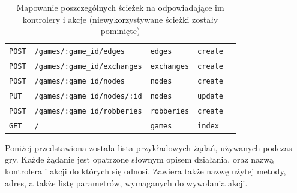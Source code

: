 \documentclass[a4paper,12pt]{article}
\begin{document}
\begin{table}[ht]
\begin{tabular}{|l|l|l|l|l|}
    \texttt{POST} & \texttt{/games/:game\_id/edges} & \texttt{edges} & \texttt{create} \\
    \texttt{POST} & \texttt{/games/:game\_id/exchanges} & \texttt{exchanges} & \texttt{create} \\
    \texttt{POST} & \texttt{/games/:game\_id/nodes} & \texttt{nodes} & \texttt{create} \\
    \texttt{PUT} & \texttt{/games/:game\_id/nodes/:id} & \texttt{nodes} & \texttt{update} \\
    \texttt{POST} & \texttt{/games/:game\_id/robberies} & \texttt{robberies} & \texttt{create} \\
    \texttt{GET} & \texttt{/} & \texttt{games} & \texttt{index} \\
    \hline
  \end{tabular}
  \caption{Mapowanie poszczególnych ścieżek na odpowiadające im
    kontrolery i akcje (niewykorzystywane ścieżki zostały pominięte)}
  \label{table:routes}
\end{table}

Poniżej przedstawiona została lista przykładowych żądań, używanych
podczas gry. Każde żądanie jest opatrzone słownym opisem działania,
oraz nazwą kontrolera i akcji do których się odnosi. Zawiera także
nazwę użytej metody, adres, a także listę parametrów, wymaganych do
wywołania akcji.
\end{document}
